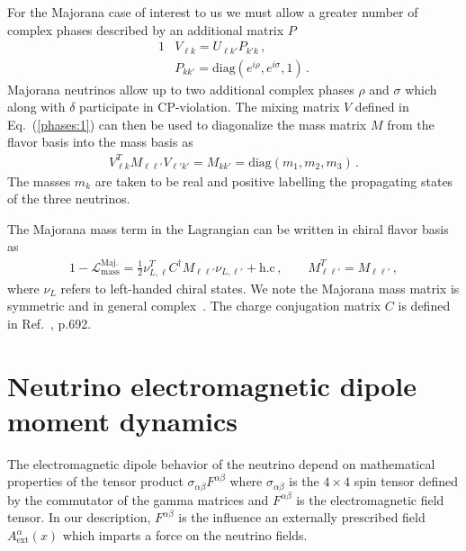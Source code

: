 \documentclass[addchapnum]{ws-rv961x669} %
\newcommand{\req}[1]{Eq.~(\ref{#1})}
\begin{document}
For the Majorana case of interest to us we must allow a greater number of complex phases described by an additional matrix $P$
\begin{alignat}{1}
	\label{phases:1} &V_{\ell k} = U_{\ell k'}P_{k'k}\,,\\
	\label{phases:3} &P_{kk'} = \mathrm{diag}(e^{i\rho},e^{i\sigma},1)\,.
\end{alignat}
Majorana neutrinos allow up to two additional complex phases $\rho$ and $\sigma$ which along with $\delta$ participate in CP-violation. The mixing matrix $V$ defined in \req{phases:1} can then be used to diagonalize the mass matrix $M$ from the flavor basis into the mass basis as
\begin{align}
    \label{diag:1}
    V_{\ell k}^{T}M_{\ell\ell'}V_{\ell'k'} = M_{kk'} = \mathrm{diag}(m_{1},m_{2},m_{3})\,.
\end{align}
The masses $m_{k}$ are taken to be real and positive labelling the propagating states of the three neutrinos.

The Majorana mass term in the Lagrangian can be written in chiral flavor basis as
\begin{alignat}{1}
	\label{mass:1} -\mathcal{L}_{\mathrm{mass}}^{\mathrm{Maj.}}=\frac{1}{2}\nu_{L,\ell}^{T}C^{\dag}M_{\ell\ell'}\nu_{L,\ell'}+\mathrm{h.c}\,,\qquad
    M_{\ell\ell'}^{T}=M_{\ell\ell'}\,,
\end{alignat}
where $\nu_{L}$ refers to left-handed chiral states. We note the Majorana mass matrix is symmetric and in general complex~\cite{Adhikary:2013bma}. The charge conjugation matrix $C$ is defined in Ref.~\cite{Itzykson:1980rh}, p.692.

\section{Neutrino electromagnetic dipole moment dynamics}
\label{sec:numoment}
The electromagnetic dipole behavior of the neutrino depend on mathematical properties of the tensor product $\sigma_{\alpha\beta}F^{\alpha\beta}$ where $\sigma_{\alpha\beta}$ is the $4\times 4$ spin tensor defined by the commutator of the gamma matrices and $F^{\alpha\beta}$ is the electromagnetic field tensor. In our description, $F^{\alpha\beta}$ is the influence an externally prescribed field $A^{\alpha}_\mathrm{ext}(x)$ which imparts a force on the neutrino fields.
\end{document}
